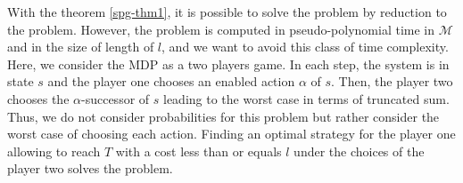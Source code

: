 With the theorem \ref{spg-thm1}, it is possible to solve the \SPG{} problem by reduction to the \SSPP{} problem.
However, the \SSPP{} problem is computed in pseudo-polynomial time in $\mathcal{M}$ and in the size of length of $l$, and we want to avoid this class of time complexity.
Here, we consider the MDP as a two players game.
In each step, the system is in state $s$ and the player one chooses an enabled action $\alpha$ of $s$.
Then, the player two chooses the $\alpha$-successor of $s$ leading to the worst case in terms of truncated sum.
Thus, we do not consider probabilities for this problem but rather consider the worst case of choosing each action.
Finding an optimal strategy for the player one allowing to reach $T$ with a cost less than or equals $l$
under the choices of the player two solves the \SPG{} problem. \\

